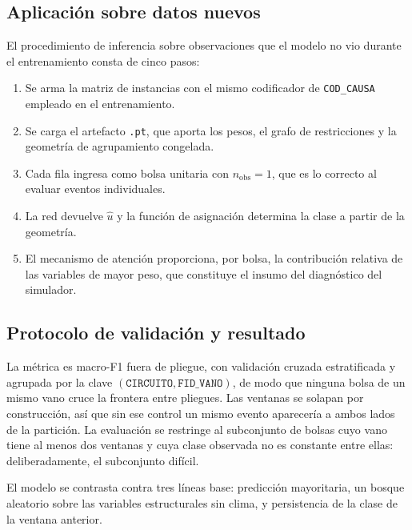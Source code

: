 \documentclass[11pt,a4paper]{article}
\begin{document}
\subsection{Aplicación sobre datos nuevos}

El procedimiento de inferencia sobre observaciones que el modelo no vio durante el
entrenamiento consta de cinco pasos:

\begin{enumerate}
  \item Se arma la matriz de instancias con el mismo codificador de \texttt{COD\_CAUSA}
        empleado en el entrenamiento.
  \item Se carga el artefacto \texttt{.pt}, que aporta los pesos, el grafo de restricciones y
        la geometría de agrupamiento congelada.
  \item Cada fila ingresa como bolsa unitaria con $n_{\text{obs}} = 1$, que es lo correcto al
        evaluar eventos individuales.
  \item La red devuelve $\hat{u}$ y la función de asignación determina la clase a partir de la
        geometría.
  \item El mecanismo de atención proporciona, por bolsa, la contribución relativa de las
        variables de mayor peso, que constituye el insumo del diagnóstico del simulador.
\end{enumerate}

\subsection{Protocolo de validación y resultado}
\label{sec:validacion}

La métrica es macro-F1 fuera de pliegue, con validación cruzada estratificada y agrupada por la
clave $(\texttt{CIRCUITO}, \texttt{FID\_VANO})$, de modo que ninguna bolsa de un mismo vano
cruce la frontera entre pliegues. Las ventanas se solapan por construcción, así que sin ese
control un mismo evento aparecería a ambos lados de la partición. La evaluación se restringe al
subconjunto de bolsas cuyo vano tiene al menos dos ventanas y cuya clase observada no es
constante entre ellas: deliberadamente, el subconjunto difícil.

El modelo se contrasta contra tres líneas base: predicción mayoritaria, un bosque aleatorio
sobre las variables estructurales sin clima, y persistencia de la clase de la ventana anterior.
\end{document}
